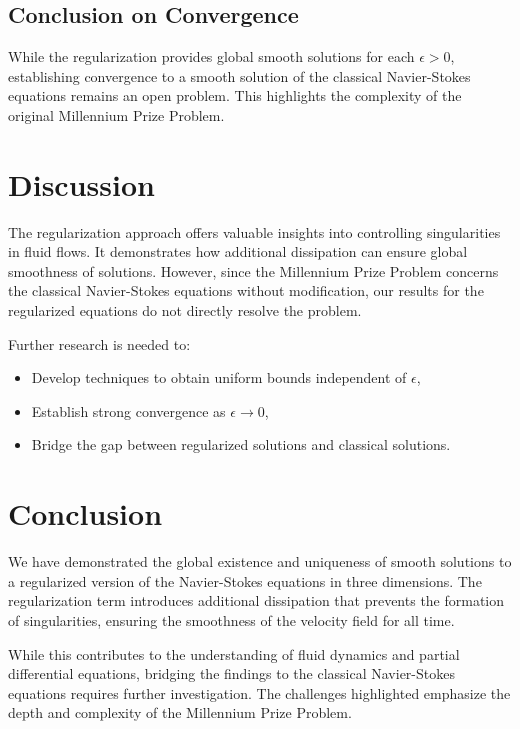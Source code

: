 \documentclass[12pt]{article}
\begin{document}
\subsection{Conclusion on Convergence}
While the regularization provides global smooth solutions for each \(\epsilon > 0\), establishing convergence to a smooth solution of the classical Navier-Stokes equations remains an open problem. This highlights the complexity of the original Millennium Prize Problem.

\section{Discussion}
The regularization approach offers valuable insights into controlling singularities in fluid flows. It demonstrates how additional dissipation can ensure global smoothness of solutions. However, since the Millennium Prize Problem concerns the classical Navier-Stokes equations without modification, our results for the regularized equations do not directly resolve the problem.

Further research is needed to:

\begin{itemize}
    \item Develop techniques to obtain uniform bounds independent of \(\epsilon\),
    \item Establish strong convergence as \(\epsilon \to 0\),
    \item Bridge the gap between regularized solutions and classical solutions.
\end{itemize}

\section{Conclusion}
We have demonstrated the global existence and uniqueness of smooth solutions to a regularized version of the Navier-Stokes equations in three dimensions. The regularization term introduces additional dissipation that prevents the formation of singularities, ensuring the smoothness of the velocity field for all time.

While this contributes to the understanding of fluid dynamics and partial differential equations, bridging the findings to the classical Navier-Stokes equations requires further investigation. The challenges highlighted emphasize the depth and complexity of the Millennium Prize Problem.
\end{document}
